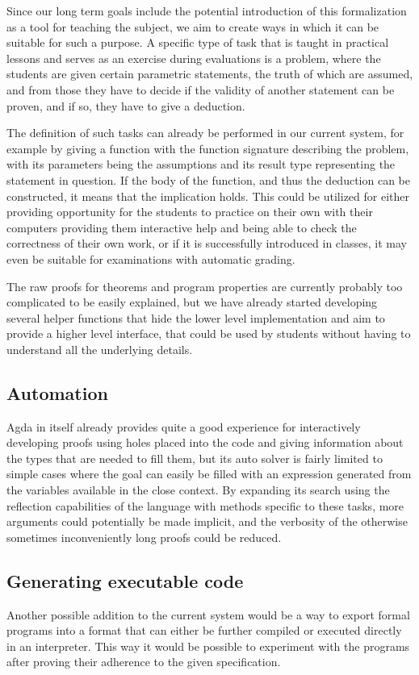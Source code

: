Since our long term goals include the potential introduction of this formalization as a tool for teaching the subject, we aim to create ways in which it can be suitable for such a purpose. A specific type of task that is taught in practical lessons and serves as an exercise during evaluations is a problem, where the students are given certain parametric statements, the truth of which are assumed, and from those they have to decide if the validity of another statement can be proven, and if so, they have to give a deduction.

The definition of such tasks can already be performed in our current system, for example by giving a function with the function signature describing the problem, with its parameters being the assumptions and its result type representing the statement in question. If the body of the function, and thus the deduction can be constructed, it means that the implication holds. This could be utilized for either providing opportunity for the students to practice on their own with their computers providing them interactive help and being able to check the correctness of their own work, or if it is successfully introduced in classes, it may even be suitable for examinations with automatic grading.

The raw proofs for theorems and program properties are currently probably too complicated to be easily explained, but we have already started developing several helper functions that hide the lower level implementation and aim to provide a higher level interface, that could be used by students without having to understand all the underlying details.

\subsection{Automation}
Agda in itself already provides quite a good experience for interactively developing proofs using holes placed into the code and giving information about the types that are needed to fill them, but its auto solver is fairly limited to simple cases where the goal can easily be filled with an expression generated from the variables available in the close context. By expanding its search using the reflection capabilities of the language with methods specific to these tasks, more arguments could potentially be made implicit, and the verbosity of the otherwise sometimes inconveniently long proofs could be reduced.

\subsection{Generating executable code}
Another possible addition to the current system would be a way to export formal programs into a format that can either be further compiled or executed directly in an interpreter. This way it would be possible to experiment with the programs after proving their adherence to the given specification.